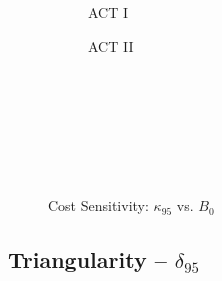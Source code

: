 \begin{figure*}[h!]
\begin{subfigure}[t]{0.45\textwidth}
    \begin{adjustbox}{width=\textwidth}
      \Large
      
    \end{adjustbox}
        \caption{ACT I}
    \end{subfigure}
    \hfill
    \begin{subfigure}[t]{0.45\textwidth}
        \centering
    \begin{adjustbox}{width=\textwidth}
      \Large
      
    \end{adjustbox}
        \caption{ACT II}
    \end{subfigure}
    \hfill \hfill ~\\ ~\\ ~\\ ~\\
  \caption[]{Cost Sensitivity: $\kappa_{95}$ vs. $B_0$} ~\\
\end{figure*}


\clearpage

\newpage

\subsection*{ Triangularity -- $\delta_{95}$ }
  \label{subsection:sensitivity_delta_95}

